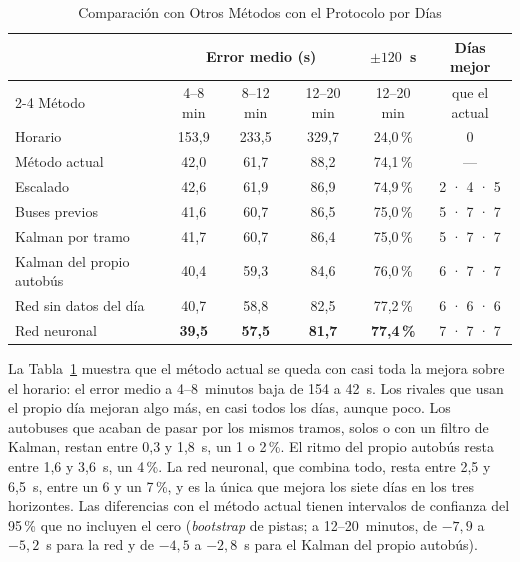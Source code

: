 \begin{table}[ht]
\centering
\caption{Comparación con Otros Métodos con el Protocolo por Días}\label{tab:comparacion}
\begin{tabular}{@{}lccccc@{}}
\toprule
& \multicolumn{3}{c}{Error medio (s)} & $\pm120$~s & Días mejor\\
\cmidrule(lr){2-4}
Método & 4--8 min & 8--12 min & 12--20 min & 12--20 min & que el actual\\
\midrule
Horario                    & 153,9 & 233,5 & 329,7 & 24,0\,\% & 0\\
Método actual              & 42,0  & 61,7  & 88,2  & 74,1\,\% & ---\\
Escalado                   & 42,6  & 61,9  & 86,9  & 74,9\,\% & 2 · 4 · 5\\
Buses previos              & 41,6  & 60,7  & 86,5  & 75,0\,\% & 5 · 7 · 7\\
Kalman por tramo           & 41,7  & 60,7  & 86,4  & 75,0\,\% & 5 · 7 · 7\\
Kalman del propio autobús  & 40,4  & 59,3  & 84,6  & 76,0\,\% & 6 · 7 · 7\\
Red sin datos del día      & 40,7  & 58,8  & 82,5  & 77,2\,\% & 6 · 6 · 6\\
Red neuronal               & \textbf{39,5} & \textbf{57,5} & \textbf{81,7} & \textbf{77,4\,\%} & 7 · 7 · 7\\
\bottomrule
\end{tabular}
\end{table}

La Tabla~\ref{tab:comparacion} muestra que el método actual se queda con casi toda la mejora sobre el horario: el
error medio a 4--8~minutos baja de 154 a 42~s. Los rivales que usan el propio día mejoran algo más, en casi todos
los días, aunque poco. Los autobuses que acaban de pasar por los mismos tramos, solos o con un filtro de Kalman, restan
entre 0,3 y 1,8~s, un 1 o 2\,\%. El ritmo del propio autobús resta entre 1,6 y 3,6~s, un 4\,\%. La red neuronal, que
combina todo, resta entre 2,5 y 6,5~s, entre un 6 y un 7\,\%, y es la única que mejora los siete días en los tres
horizontes. Las diferencias con el método actual tienen intervalos de confianza del 95\,\% que no incluyen el cero
(\emph{bootstrap} de pistas; a 12--20~minutos, de $-7{,}9$ a $-5{,}2$~s para la red y de $-4{,}5$ a $-2{,}8$~s para el
Kalman del propio autobús).

